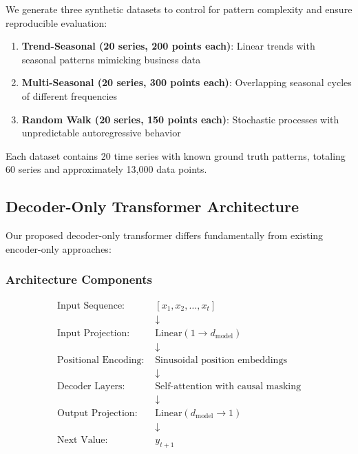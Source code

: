 \documentclass[11pt]{article}
\begin{document}
We generate three synthetic datasets to control for pattern complexity and ensure reproducible evaluation:

\begin{enumerate}
\item \textbf{Trend-Seasonal (20 series, 200 points each)}: Linear trends with seasonal patterns mimicking business data
\item \textbf{Multi-Seasonal (20 series, 300 points each)}: Overlapping seasonal cycles of different frequencies
\item \textbf{Random Walk (20 series, 150 points each)}: Stochastic processes with unpredictable autoregressive behavior
\end{enumerate}

Each dataset contains 20 time series with known ground truth patterns, totaling 60 series and approximately 13,000 data points.

\subsection{Decoder-Only Transformer Architecture}

Our proposed decoder-only transformer differs fundamentally from existing encoder-only approaches:

\subsubsection{Architecture Components}

\begin{align}
\text{Input Sequence: } &[x_1, x_2, \ldots, x_t] \nonumber\\
&\downarrow \nonumber\\
\text{Input Projection: } &\text{Linear}(1 \to d_{\text{model}}) \nonumber\\
&\downarrow \nonumber\\
\text{Positional Encoding: } &\text{Sinusoidal position embeddings} \nonumber\\
&\downarrow \nonumber\\
\text{Decoder Layers: } &\text{Self-attention with causal masking} \nonumber\\
&\downarrow \nonumber\\
\text{Output Projection: } &\text{Linear}(d_{\text{model}} \to 1) \nonumber\\
&\downarrow \nonumber\\
\text{Next Value: } &y_{t+1} \nonumber
\end{align}
\end{document}
